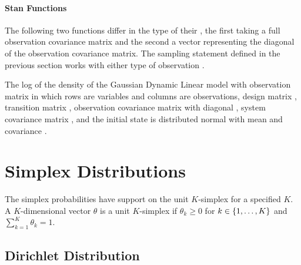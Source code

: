 
\subsubsection{Stan Functions}

The following two functions differ in the type of their , the
first taking a full observation covariance matrix  and the
second a vector  representing the diagonal of the observation
covariance matrix.  The sampling statement defined in the previous
section works with either type of observation .

\begin{description}
%
% 
%
 {The log of the density of the Gaussian Dynamic
  Linear model with observation matrix  in which rows are
  variables and columns are observations, design matrix ,
  transition matrix , observation covariance matrix with
  diagonal , system covariance matrix , and the
  initial state is distributed normal with mean  and
  covariance .}
%
\end{description}


\chapter{Simplex Distributions}

\noindent
The simplex probabilities have support on the unit $K$-simplex for a
specified $K$.  A $K$-dimensional vector $\theta$ is a unit
$K$-simplex if $\theta_k \geq 0$ for $k \in \setlist{1,\ldots,K}$ and
$\sum_{k = 1}^K \theta_k = 1$.


\section{Dirichlet Distribution}

